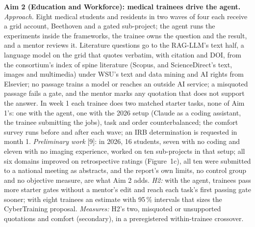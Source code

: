 \documentclass[10pt,letterpaper]{article}
\newcommand{\aim}[1]{{\color{teal}\bfseries #1}}
\newcommand{\pct}{\,\%}
\begin{document}
\aim{Aim 2 (Education and Workforce): medical trainees drive the agent.} \emph{Approach.} Eight medical students and
residents in two waves of four each receive a grid account, Beethoven and a gated sub-project; the agent runs the experiments inside the frameworks, the trainee owns the question and the
result, and a mentor reviews it. Literature questions go to the RAG-LLM's text half, a language model on the grid that quotes verbatim, with
citation and DOI, from the consortium's index of spine literature (Scopus, and ScienceDirect's text, images and
multimedia) under WSU's text and data mining and AI rights from Elsevier; no passage trains a model or
reaches an outside AI service; a misquoted passage fails a gate, and the mentor marks any quotation that does not support the answer. In week 1 each trainee does two
matched starter tasks, none of Aim 1's: one with the agent, one with the 2026 setup (Claude as a coding assistant, the
trainee submitting the jobs), task and order counterbalanced; the comfort survey runs before and after each wave; an
IRB determination is requested in month 1. \emph{Preliminary work} [9]: in 2026, 16 students, seven with no
coding and eleven with no imaging experience, worked on ten sub-projects in that setup; all six domains improved on
retrospective ratings (Figure~1c), all ten were submitted to a national meeting as abstracts, and the report's own limits, no
control group and no objective measure, are what Aim 2 adds. \emph{H2:}
with the agent, trainees pass more starter gates without a mentor's edit and reach each task's first passing gate
sooner; with eight trainees an estimate with 95\pct{} intervals that sizes the CyberTraining proposal.
\emph{Measures:} H2's two, misquoted or unsupported quotations and comfort (secondary), in a preregistered
within-trainee crossover.
\end{document}
